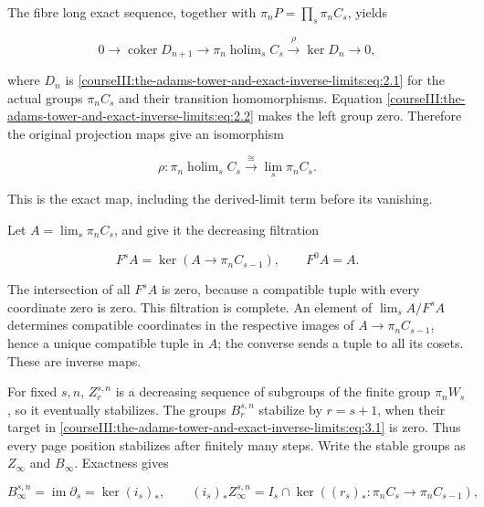 The fibre long exact sequence, together with \(\pi_nP=\prod_s\pi_nC_s\), yields

\begin{equation}
0\longrightarrow\operatorname{coker}D_{n+1}
 \longrightarrow\pi_n\operatorname{holim}_s C_s
 \xrightarrow{\rho}\ker D_n\longrightarrow0,
 \label{courseIII:the-adams-tower-and-exact-inverse-limits:eq:4.1}
\end{equation}

where \(D_n\) is \eqref{courseIII:the-adams-tower-and-exact-inverse-limits:eq:2.1} for the actual groups \(\pi_nC_s\) and their transition homomorphisms. Equation \eqref{courseIII:the-adams-tower-and-exact-inverse-limits:eq:2.2} makes the left group zero. Therefore the original projection maps give an isomorphism

\begin{equation}
\rho:\pi_n\operatorname{holim}_s C_s
             \xrightarrow{\cong}\lim_s\pi_nC_s.
 \label{courseIII:the-adams-tower-and-exact-inverse-limits:eq:4.2}
\end{equation}

This is the exact map, including the derived-limit term before its vanishing.

Let \(A=\lim_s\pi_nC_s\), and give it the decreasing filtration

\begin{equation}
F^sA=\ker(A\longrightarrow\pi_nC_{s-1}),\qquad F^0A=A.
 \label{courseIII:the-adams-tower-and-exact-inverse-limits:eq:4.3}
\end{equation}

The intersection of all \(F^sA\) is zero, because a compatible tuple with every coordinate zero is zero. This filtration is complete. An element of
\(\lim_s A/F^sA\) determines compatible coordinates in the respective images of \(A\to\pi_nC_{s-1}\), hence a unique compatible tuple in \(A\); the converse sends a tuple to all its cosets. These are inverse maps.

For fixed \(s,n\), \(Z_r^{s,n}\) is a decreasing sequence of subgroups of the finite group \(\pi_nW_s\), so it eventually stabilizes. The groups \(B_r^{s,n}\) stabilize by \(r=s+1\), when their target in \eqref{courseIII:the-adams-tower-and-exact-inverse-limits:eq:3.1} is zero. Thus every page position stabilizes after finitely many steps. Write the stable groups as \(Z_\infty\) and \(B_\infty\). Exactness gives

\begin{equation}
B_\infty^{s,n}=\operatorname{im}\partial_s=\ker(i_s)_*,
 \qquad
 (i_s)_*Z_\infty^{s,n}
    =I_s\cap\ker((r_s)_*:\pi_nC_s\to\pi_nC_{s-1}),
 \label{courseIII:the-adams-tower-and-exact-inverse-limits:eq:4.4}
\end{equation}

